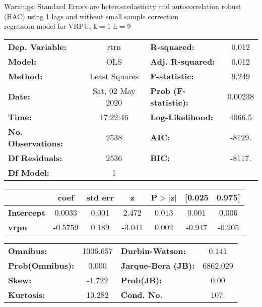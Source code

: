 Warnings: \newline
 [1] Standard Errors are heteroscedasticity and autocorrelation robust (HAC) using 1 lags and without small sample correction\\ 

regression model for VRPU, k = 1 h = 9\begin{center}
\begin{tabular}{lclc}
\toprule
\textbf{Dep. Variable:}    &       rtrn       & \textbf{  R-squared:         } &     0.012   \\
\textbf{Model:}            &       OLS        & \textbf{  Adj. R-squared:    } &     0.012   \\
\textbf{Method:}           &  Least Squares   & \textbf{  F-statistic:       } &     9.249   \\
\textbf{Date:}             & Sat, 02 May 2020 & \textbf{  Prob (F-statistic):} &  0.00238    \\
\textbf{Time:}             &     17:22:46     & \textbf{  Log-Likelihood:    } &    4066.5   \\
\textbf{No. Observations:} &        2538      & \textbf{  AIC:               } &    -8129.   \\
\textbf{Df Residuals:}     &        2536      & \textbf{  BIC:               } &    -8117.   \\
\textbf{Df Model:}         &           1      & \textbf{                     } &             \\
\bottomrule
\end{tabular}
\begin{tabular}{lcccccc}
                   & \textbf{coef} & \textbf{std err} & \textbf{z} & \textbf{P$> |$z$|$} & \textbf{[0.025} & \textbf{0.975]}  \\
\midrule
\textbf{Intercept} &       0.0033  &        0.001     &     2.472  &         0.013        &        0.001    &        0.006     \\
\textbf{vrpu}      &      -0.5759  &        0.189     &    -3.041  &         0.002        &       -0.947    &       -0.205     \\
\bottomrule
\end{tabular}
\begin{tabular}{lclc}
\textbf{Omnibus:}       & 1006.657 & \textbf{  Durbin-Watson:     } &    0.141  \\
\textbf{Prob(Omnibus):} &   0.000  & \textbf{  Jarque-Bera (JB):  } & 6862.029  \\
\textbf{Skew:}          &  -1.722  & \textbf{  Prob(JB):          } &     0.00  \\
\textbf{Kurtosis:}      &  10.282  & \textbf{  Cond. No.          } &     107.  \\
\bottomrule
\end{tabular}
\end{center}

